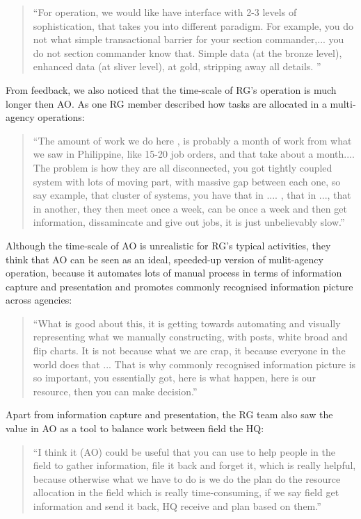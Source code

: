 \begin{quotation}
``For operation, we would like have interface with 2-3 levels of sophistication, that takes you into different paradigm. For example, you do not what simple transactional barrier for your section commander,...  you do not section commander know that. Simple data (at the bronze level), enhanced data (at sliver level), at gold, stripping away all details. ''
\end{quotation}

From feedback, we also noticed that the time-scale of \ac{RG}'s operation is much longer then \ac{AO}. As one \ac{RG} member described how tasks are allocated in a multi-agency operations: 

\begin{quotation}
``The amount of work we do here , is probably a month of work from what we saw in Philippine, like 15-20 job orders, and that take about a month.... The problem is how they are all disconnected, you got tightly coupled system with lots of moving part, with massive gap between each one, so say example, that cluster of systems, you have that in .... , that in ..., that in another, they then meet once a week, can be once a week and then get information, dissamincate and give out jobs, it is just unbelievably slow.''
\end{quotation}

Although the time-scale of \ac{AO} is unrealistic for \ac{RG}'s typical activities,  they think that \ac{AO} can be seen as an ideal, speeded-up version of mulit-agency operation, because it automates lots of manual process in terms of information capture and presentation and promotes commonly recognised information picture across agencies:

\begin{quotation}
``What is good about this, it is getting towards automating and visually representing what we manually constructing, with posts, white broad and flip charts. It is not because what we are crap, it because everyone in the world does that ...  That is why commonly recognised information picture is so important, you essentially got, here is what happen, here is our resource, then you can make decision.''
\end{quotation}

Apart from information capture and presentation, the \ac{RG} team also saw the value in \ac{AO} as a tool to balance work between field the HQ: 

\begin{quotation}
``I think it (\ac{AO}) could be useful that you can use to help people in the field to gather information, file it back and forget it, which is really helpful, because otherwise what we have to do is we do the plan do the resource allocation in the field which is really time-consuming, if we say field get information and send it back, HQ receive and plan based on them.''
\end{quotation}

